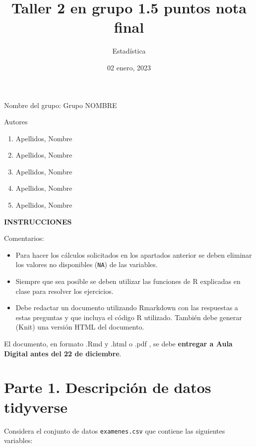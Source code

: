 \documentclass[
]{article}
\title{Taller 2 en grupo 1.5 puntos nota final}
\author{Estadística}
\date{02 enero, 2023}
\providecommand{\tightlist}{%
  \setlength{\itemsep}{0pt}\setlength{\parskip}{0pt}}
\begin{document}
\maketitle

{
\hypersetup{linkcolor=blue}
\setcounter{tocdepth}{3}
\tableofcontents
}
Nombre del grupo: Grupo NOMBRE

Autores

\begin{enumerate}
\def\labelenumi{\arabic{enumi}.}
\tightlist
\item
  Apellidos, Nombre
\item
  Apellidos, Nombre
\item
  Apellidos, Nombre
\item
  Apellidos, Nombre
\item
  Apellidos, Nombre
\end{enumerate}

\textbf{INSTRUCCIONES}

Comentarios:

\begin{itemize}
\item
  Para hacer los cálculos solicitados en los apartados anterior se deben
  eliminar los valores no disponibles (\texttt{NA}) de las variables.
\item
  Siempre que sea posible se deben utilizar las funciones de R
  explicadas en clase para resolver los ejercicios.
\item
  Debe redactar un documento utilizando Rmarkdown con las respuestas a
  estas preguntas y que incluya el código R utilizado. También debe
  generar (Knit) una versión HTML del documento.
\end{itemize}

El documento, en formato .Rmd y .html o .pdf , se debe \textbf{entregar
a Aula Digital antes del 22 de diciembre}.

\hypertarget{parte-1.-descripciuxf3n-de-datos-tidyverse}{%
\section{Parte 1. Descripción de datos
tidyverse}\label{parte-1.-descripciuxf3n-de-datos-tidyverse}}

Considera el conjunto de datos \texttt{examenes.csv} que contiene las
siguientes variables:
\end{document}
